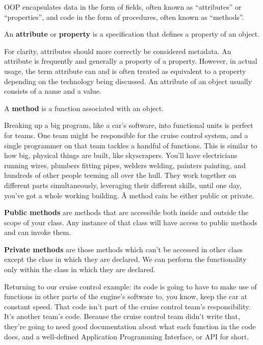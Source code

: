 OOP encapsulates data in the form of fields, often known as ``attributes'' or ``properties'', and code in the form of
procedures, often known as ``methods''.

An \textbf{attribute} or \textbf{property} is a specification that defines a property of an object.
\ed

For clarity, attributes should more correctly be considered metadata. An attribute is frequently and generally a
property of a property. However, in actual usage, the term attribute can and is often treated as equivalent to a
property depending on the technology being discussed. An attribute of an object usually consists of a name and a value.

\bd[Method]
A \textbf{method} is a function associated with an object.
\ed

Breaking up a big program, like a car's software, into functional units is perfect for teams. One team might be
responsible for the cruise control system, and a single programmer on that team tackles a handful of functions. This
is similar to how big, physical things are built, like skyscrapers. You'll have electricians running wires, plumbers
fitting pipes, welders welding, painters painting, and hundreds of other people teeming all over the hull. They work
together on different parts simultaneously, leveraging their different skills, until one day, you've got a whole
working building. \v

A method cain be either public or private.

\textbf{Public methods} are methods that are accessible both inside and outside the scope of your class. Any instance
of that class will have access to public methods and can invoke them.
\ed

\textbf{Private methods} are those methods which can't be accessed in other class except the class in which they are
declared. We can perform the functionality only within the class in which they are declared.
\ed

\be
Returning to our cruise control example: its code is going to have to make use of functions in other parts of the
engine's software to, you know, keep the car at constant speed. That code isn't part of the cruise control team's
responsibility. It's another team's code. Because the cruise control team didn't write that, they're going to need
good documentation about what each function in the code does, and a well-defined Application Programming Interface,
or API for short.
\ee

